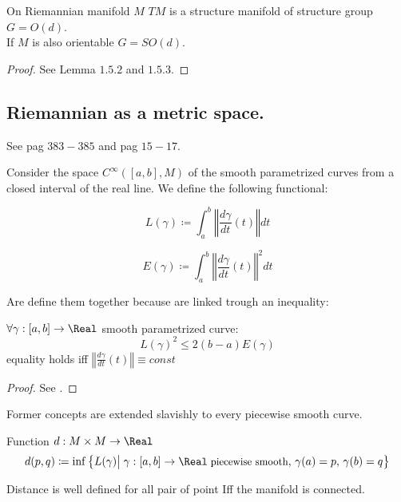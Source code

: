 \documentclass[a4paper,12pt]{scrartcl}    %
\begin{document}
\begin{theorem}
 On Riemannian manifold $M$ $TM$ is a structure manifold of structure group $G= O(d)$.
 \\
 If $M$ is also orientable $G= SO(d)$.
\end{theorem}
\begin{proof}
 See \cite{Jost2005} Lemma $1.5.2$ and $1.5.3$.
\end{proof}

\subsection{Riemannian as a metric space.}
 See \cite{Abate2011} pag $383-385$  and \cite{Jost2005} pag $15-17$.
 
 Consider the space $C^\infty([a,b],M)$ of the smooth parametrized curves from a closed interval of the real line.
 We define the following functional:
 \begin{definition}
 	\begin{displaymath}
 		L(\gamma) \coloneqq \int_a^b \left\Vert \frac{d \gamma}{dt} (t)\right\Vert dt
 	\end{displaymath}
\end{definition} 
 
\begin{definition}
  	\begin{displaymath}
 		E(\gamma) \coloneqq \int_a^b \left\Vert \frac{d \gamma}{dt} (t)\right\Vert^2 dt
 	\end{displaymath}
\end{definition} 
Are define them together because are linked trough an inequality:
\begin{proposition}
	$\forall \gamma : [a,b] \rightarrow \Real$ smooth parametrized curve:
	\begin{equation}
		L(\gamma)^2 \leq 2(b-a)E(\gamma)
	\end{equation}
	equality holds iff $\left\Vert \frac{d \gamma}{dt} (t)\right\Vert \equiv const $
\end{proposition}	
\begin{proof}
	 See \cite[Lemma $1.4.2$ ]{Jost2005}.
\end{proof}
	
\begin{observation}
	Former concepts are extended slavishly to every piecewise smooth curve.
\end{observation}

\begin{definition}
	Function $d:M\times M \rightarrow \Real$
	\begin{displaymath}
		d(p,q)\coloneqq \inf\big\{L(\gamma) \big\vert \; \gamma:[a,b]\rightarrow \Real \; \textrm{\small piecewise smooth},\, \gamma(a)=p,\, \gamma(b)=q  \big\}
	\end{displaymath}
\end{definition}
\begin{observation}
	Distance is well defined for all pair of point Iff the manifold is connected. 
\end{observation}
\end{document}
